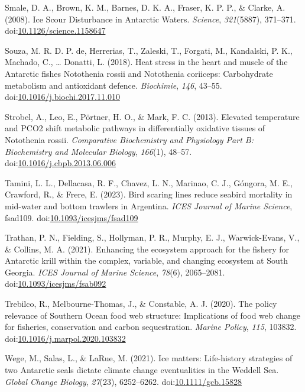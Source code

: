 \documentclass[
]{article}
\newlength{\cslhangindent}
\newenvironment{CSLReferences}[2] %
 {\begin{list}{}{%
  \setlength{\itemindent}{0pt}
  \setlength{\leftmargin}{0pt}
  \setlength{\parsep}{0pt}
  \ifodd #1
   \setlength{\leftmargin}{\cslhangindent}
   \setlength{\itemindent}{-1\cslhangindent}
  \fi
  \setlength{\itemsep}{#2\baselineskip}}}
 {\end{list}}
\begin{document}
\begin{CSLReferences}{1}{0}
Smale, D. A., Brown, K. M., Barnes, D. K. A., Fraser, K. P. P., \&
Clarke, A. (2008). Ice {Scour Disturbance} in {Antarctic Waters}.
\emph{Science}, \emph{321}(5887), 371--371.
doi:\href{https://doi.org/10.1126/science.1158647}{10.1126/science.1158647}

Souza, M. R. D. P. de, Herrerias, T., Zaleski, T., Forgati, M.,
Kandalski, P. K., Machado, C., \ldots{} Donatti, L. (2018). Heat stress
in the heart and muscle of the {Antarctic} fishes {Notothenia} rossii
and {Notothenia} coriiceps: {Carbohydrate} metabolism and antioxidant
defence. \emph{Biochimie}, \emph{146}, 43--55.
doi:\href{https://doi.org/10.1016/j.biochi.2017.11.010}{10.1016/j.biochi.2017.11.010}

Strobel, A., Leo, E., Pörtner, H. O., \& Mark, F. C. (2013). Elevated
temperature and {PCO2} shift metabolic pathways in differentially
oxidative tissues of {Notothenia} rossii. \emph{Comparative Biochemistry
and Physiology Part B: Biochemistry and Molecular Biology},
\emph{166}(1), 48--57.
doi:\href{https://doi.org/10.1016/j.cbpb.2013.06.006}{10.1016/j.cbpb.2013.06.006}

Tamini, L. L., Dellacasa, R. F., Chavez, L. N., Marinao, C. J., Góngora,
M. E., Crawford, R., \& Frere, E. (2023). Bird scaring lines reduce
seabird mortality in mid-water and bottom trawlers in {Argentina}.
\emph{ICES Journal of Marine Science}, fsad109.
doi:\href{https://doi.org/10.1093/icesjms/fsad109}{10.1093/icesjms/fsad109}

Trathan, P. N., Fielding, S., Hollyman, P. R., Murphy, E. J.,
Warwick-Evans, V., \& Collins, M. A. (2021). Enhancing the ecosystem
approach for the fishery for {Antarctic} krill within the complex,
variable, and changing ecosystem at {South Georgia}. \emph{ICES Journal
of Marine Science}, \emph{78}(6), 2065--2081.
doi:\href{https://doi.org/10.1093/icesjms/fsab092}{10.1093/icesjms/fsab092}

Trebilco, R., Melbourne-Thomas, J., \& Constable, A. J. (2020). The
policy relevance of {Southern Ocean} food web structure: {Implications}
of food web change for fisheries, conservation and carbon sequestration.
\emph{Marine Policy}, \emph{115}, 103832.
doi:\href{https://doi.org/10.1016/j.marpol.2020.103832}{10.1016/j.marpol.2020.103832}

Wege, M., Salas, L., \& LaRue, M. (2021). Ice matters: {Life-history}
strategies of two {Antarctic} seals dictate climate change eventualities
in the {Weddell Sea}. \emph{Global Change Biology}, \emph{27}(23),
6252--6262.
doi:\href{https://doi.org/10.1111/gcb.15828}{10.1111/gcb.15828}


\end{CSLReferences}
\end{document}
